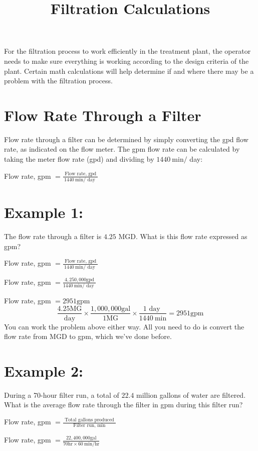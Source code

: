 \documentclass[10pt]{article}
\title{Filtration Calculations }
\author{}
\date{}
\begin{document}
\maketitle
For the filtration process to work efficiently in the treatment plant, the operator needs to make sure everything is working according to the design criteria of the plant. Certain math calculations will help determine if and where there may be a problem with the filtration process.

\section{Flow Rate Through a Filter}
Flow rate through a filter can be determined by simply converting the gpd flow rate, as indicated on the flow meter. The gpm flow rate can be calculated by taking the meter flow rate (gpd) and dividing by $1440 \mathrm{~min} /$ day:

Flow rate, gpm $=\frac{\text { Flow rate, gpd }}{1440 \mathrm{~min} / \text { day }}$

\section{Example 1:}
The flow rate through a filter is $4.25$ MGD. What is this flow rate expressed as gpm?

Flow rate, gpm $=\frac{\text { Flow rate, gpd }}{1440 \mathrm{~min} / \text { day }}$

Flow rate, gpm $=\frac{4,250,000 \mathrm{gpd}}{1440 \mathrm{~min} / \text { day }}$

Flow rate, gpm $=2951 \mathrm{gpm}$
$$
\frac{4.25 \mathrm{MG}}{\text { day }} \times \frac{1,000,000 \mathrm{gal}}{1 \mathrm{MG}} \times \frac{1 \text { day }}{1440 \mathrm{~min}}=2951 \mathrm{gpm}
$$
You can work the problem above either way. All you need to do is convert the flow rate from MGD to gpm, which we've done before.

\section{Example 2:}
During a 70-hour filter run, a total of $22.4$ million gallons of water are filtered. What is the average flow rate through the filter in gpm during this filter run?

Flow rate, gpm $=\frac{\text { Total gallons produced }}{\text { Filter run, min }}$

Flow rate, gpm $=\frac{22,400,000 \mathrm{gal}}{70 \mathrm{hr} \times 60 \mathrm{~min} / \mathrm{hr}}$
\end{document}
